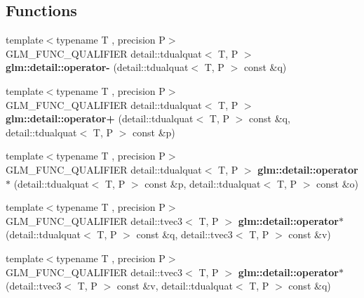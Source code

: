 \subsection*{Functions}
\begin{DoxyCompactItemize}
\item 
{\footnotesize template$<$typename T , precision P$>$ }\\G\+L\+M\+\_\+\+F\+U\+N\+C\+\_\+\+Q\+U\+A\+L\+I\+F\+I\+ER detail\+::tdualquat$<$ T, P $>$ {\bfseries glm\+::detail\+::operator-\/} (detail\+::tdualquat$<$ T, P $>$ const \&q)\hypertarget{dual__quaternion_8inl_ac0769b92455a8ce14af1079732197e93}{}\label{dual__quaternion_8inl_ac0769b92455a8ce14af1079732197e93}

\item 
{\footnotesize template$<$typename T , precision P$>$ }\\G\+L\+M\+\_\+\+F\+U\+N\+C\+\_\+\+Q\+U\+A\+L\+I\+F\+I\+ER detail\+::tdualquat$<$ T, P $>$ {\bfseries glm\+::detail\+::operator+} (detail\+::tdualquat$<$ T, P $>$ const \&q, detail\+::tdualquat$<$ T, P $>$ const \&p)\hypertarget{dual__quaternion_8inl_a5736e2e9b7b856b68da0042a2d80595e}{}\label{dual__quaternion_8inl_a5736e2e9b7b856b68da0042a2d80595e}

\item 
{\footnotesize template$<$typename T , precision P$>$ }\\G\+L\+M\+\_\+\+F\+U\+N\+C\+\_\+\+Q\+U\+A\+L\+I\+F\+I\+ER detail\+::tdualquat$<$ T, P $>$ {\bfseries glm\+::detail\+::operator$\ast$} (detail\+::tdualquat$<$ T, P $>$ const \&p, detail\+::tdualquat$<$ T, P $>$ const \&o)\hypertarget{dual__quaternion_8inl_a90cb650dadb13bab9ce166e26101afec}{}\label{dual__quaternion_8inl_a90cb650dadb13bab9ce166e26101afec}

\item 
{\footnotesize template$<$typename T , precision P$>$ }\\G\+L\+M\+\_\+\+F\+U\+N\+C\+\_\+\+Q\+U\+A\+L\+I\+F\+I\+ER detail\+::tvec3$<$ T, P $>$ {\bfseries glm\+::detail\+::operator$\ast$} (detail\+::tdualquat$<$ T, P $>$ const \&q, detail\+::tvec3$<$ T, P $>$ const \&v)\hypertarget{dual__quaternion_8inl_a6e71d3a7488f0259ece91fe7c40f18e7}{}\label{dual__quaternion_8inl_a6e71d3a7488f0259ece91fe7c40f18e7}

\item 
{\footnotesize template$<$typename T , precision P$>$ }\\G\+L\+M\+\_\+\+F\+U\+N\+C\+\_\+\+Q\+U\+A\+L\+I\+F\+I\+ER detail\+::tvec3$<$ T, P $>$ {\bfseries glm\+::detail\+::operator$\ast$} (detail\+::tvec3$<$ T, P $>$ const \&v, detail\+::tdualquat$<$ T, P $>$ const \&q)\hypertarget{dual__quaternion_8inl_a31e9bd1f164b5042e0bb0dddfb5d0d29}{}\label{dual__quaternion_8inl_a31e9bd1f164b5042e0bb0dddfb5d0d29}


\end{DoxyCompactItemize}
